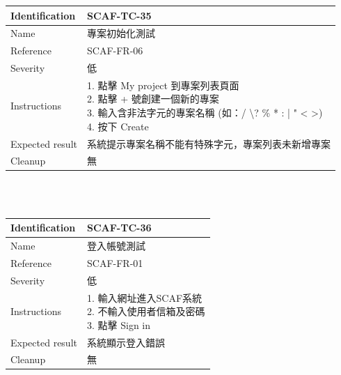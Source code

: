 \documentclass{report}
\begin{document}
\begin{tabularx}{\textwidth}{
  |p{}%
  |p{}|%
  }
  \hline
  \centering Identification &  SCAF-TC-35 \\
  \hline
  \centering Name & 專案初始化測試 \\
  \hline
  \centering Reference & SCAF-FR-06 \\
  \hline
  \centering Severity & 低 \\
  \hline
  \centering Instructions & 
  \makecell[l]{
    1. 點擊 My project 到專案列表頁面 \\
    2. 點擊 + 號創建一個新的專案 \\
    3. 輸入含非法字元的專案名稱 
    (如：/ \textbackslash ? \% * : |  " < >) \\
    4. 按下 Create
  }\\
  \hline
  \centering Expected result & 系統提示專案名稱不能有特殊字元，專案列表未新增專案 \\
  \hline
  \centering Cleanup & 無 \\
  \hline
\end{tabularx}
\\
\newline
\\
\begin{tabularx}{\textwidth}{
  |p{}%
  |p{}|%
  }
  \hline
  \centering Identification &  SCAF-TC-36\\
  \hline
  \centering Name & 登入帳號測試 \\
  \hline
  \centering Reference & SCAF-FR-01 \\
  \hline
  \centering Severity & 低 \\
  \hline
  \centering Instructions & 
  \makecell[l]{
    1. 輸入網址進入SCAF系統 \\
    2. 不輸入使用者信箱及密碼 \\
    3. 點擊 Sign in
  }\\
  \hline
  \centering Expected result & 系統顯示登入錯誤 \\
  \hline
  \centering Cleanup & 無 \\
  \hline
\end{tabularx}
\\
\newline
\\
\end{document}
